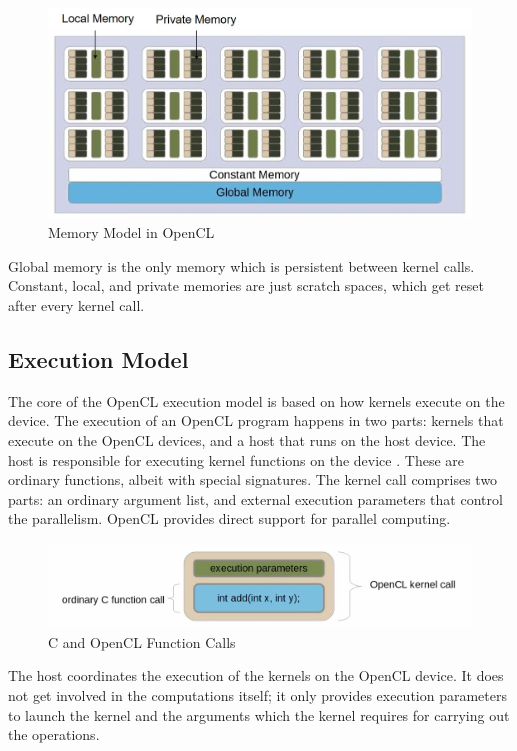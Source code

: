 \begin{itemize}
\begin{figure}[h!]
 \centering
  \includegraphics[width=\linewidth]{figures/OpenCL_Memory_Model.jpg}
  \caption{Memory Model in OpenCL \cite{opencl_ajg}}
  \label{fig:opencl2}
\end{figure}
\end{itemize}
Global memory is the only memory which is persistent between kernel calls. Constant, local, and private memories are just scratch spaces, which get reset after every kernel call.

 \subsection{Execution Model}
 \label{sect4_1_3}
The core of the OpenCL execution model is based on how kernels execute on the device. The execution of an OpenCL program happens in two parts: kernels that execute on the OpenCL devices, and a host that runs on the host device. The host is responsible for executing kernel functions on the device \cite{opencl_khronos}. These are ordinary functions, albeit with special signatures. The kernel call comprises two parts: an ordinary argument list, and external execution parameters that control the parallelism. OpenCL provides direct support for parallel computing. \newline\newline
\begin{figure}[h!]
\centering
\includegraphics[width=\linewidth]{figures/C_and_OpenCL_Function_Calls.png}
\caption{C and OpenCL Function Calls \cite{opencl_ajg}}
\label{fig:opencl3}
\end{figure}
The host coordinates the execution of the kernels on the OpenCL device. It does not get involved in the computations itself; it only provides execution parameters to launch the kernel and the arguments which the kernel requires for carrying out the operations. 

